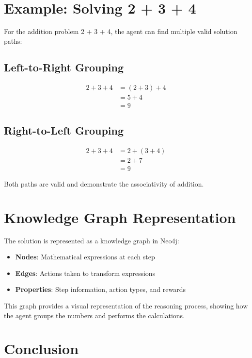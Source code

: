 \documentclass{article}
\begin{document}
\section{Example: Solving 2 + 3 + 4}

For the addition problem 2 + 3 + 4, the agent can find multiple valid solution paths:

\subsection{Left-to-Right Grouping}
\begin{align}
    2 + 3 + 4 & = (2 + 3) + 4 \\
              & = 5 + 4       \\
              & = 9
\end{align}

\subsection{Right-to-Left Grouping}
\begin{align}
    2 + 3 + 4 & = 2 + (3 + 4) \\
              & = 2 + 7       \\
              & = 9
\end{align}

Both paths are valid and demonstrate the associativity of addition.

\section{Knowledge Graph Representation}

The solution is represented as a knowledge graph in Neo4j:
\begin{itemize}
    \item \textbf{Nodes}: Mathematical expressions at each step
    \item \textbf{Edges}: Actions taken to transform expressions
    \item \textbf{Properties}: Step information, action types, and rewards
\end{itemize}

This graph provides a visual representation of the reasoning process, showing how the agent groups the numbers and performs the calculations.

\section{Conclusion}
\end{document}
